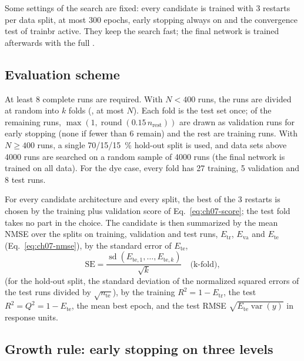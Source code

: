 Some settings of the search are fixed: every candidate is trained with 3 restarts per data split, at most 300
epochs, early stopping always on and the convergence test of trainbr active. They keep the search fast; the final
network is trained afterwards with the full .

\subsection{Evaluation scheme}

At least 8 complete runs are required. With $N < 400$ runs, the runs are divided at random into $k$ folds
(, at most $N$). Each fold is the test set once; of the remaining runs,
$\max(1, \operatorname{round}(0.15\,n_\text{rest}))$ are drawn as validation runs for early stopping (none if fewer
than 6 remain) and the rest are training runs. With $N \ge 400$ runs, a single 70/15/15~\% hold-out split is
used, and data sets above 4000 runs are searched on a random sample of 4000 runs (the final network is trained on
all data). For the dye case, every fold has 27 training, 5 validation and 8 test runs.

For every candidate architecture and every split, the best of the 3 restarts is chosen by the training plus
validation score of Eq.~\eqref{eq:ch07-score}; the test fold takes no part in the choice. The candidate is then
summarized by the mean NMSE over the splits on training, validation and test runs, $E_\text{tr}$, $E_\text{va}$
and $E_\text{te}$ (Eq.~\eqref{eq:ch07-nmse}), by the standard error of $E_\text{te}$,
\begin{equation}
  \text{SE} = \frac{\operatorname{sd}(E_{\text{te},1},\dots,E_{\text{te},k})}{\sqrt{k}}
  \quad\text{(k-fold)}, \label{eq:ch07-se}
\end{equation}
(for the hold-out split, the standard deviation of the normalized squared errors of the test runs divided by
$\sqrt{n_\text{te}}$), by the training $R^2 = 1 - E_\text{tr}$, the test $R^2 = Q^2 = 1 - E_\text{te}$, the mean
best epoch, and the test RMSE $\sqrt{E_\text{te}\operatorname{var}(y)}$ in response units.

\subsection{Growth rule: early stopping on three levels}\label{sec:ch07-growth}

